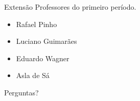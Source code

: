 \documentclass[aspectratio=169]{beamer}
\begin{document}
\begin{frame}{Extensão}
Professores do primeiro período.
    \begin{itemize}
        \item Rafael Pinho
        \pause{}
        \item Luciano Guimarães
        \pause{}
        \item Eduardo Wagner
        \pause{}
        \item Asla de Sá
    \end{itemize}
\end{frame}

\begin{frame}[standout]
  Perguntas?
\end{frame}

\end{document}
